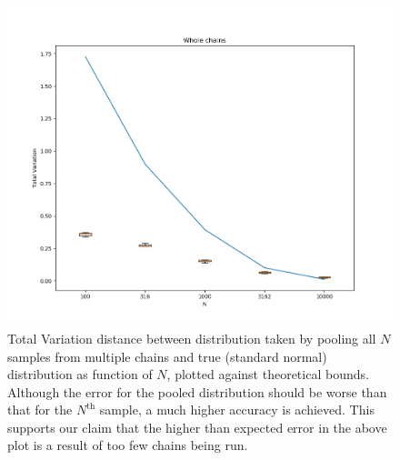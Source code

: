 \begin{figure}[H]
	\centering
		\includegraphics[height=0.35\textheight]{Figures/DM_plot_whole_chain.png}
	\caption{Total Variation distance between distribution taken by pooling all $N$ samples from multiple chains and true (standard normal) distribution as function of $N$, plotted against theoretical bounds.  Although the error for the pooled distribution should be worse than that for the $N^{\text{th}}$ sample, a much higher accuracy is achieved.  This supports our claim that the higher than expected error in the above plot is a result of too few chains being run.}
	\label{fig:DMwhole}
\end{figure}